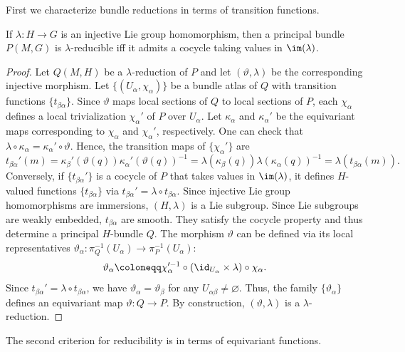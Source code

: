 First we characterize bundle reductions in terms of transition functions.

\begin{prop}[{{\cite[Prop.~1.6.1]{RS2}}}]\label{prop 1.6.1 RS2}
    If $\lambda:H\to G$ is an injective Lie group homomorphism, then a principal bundle $P(M,G)$ is $\lambda$-reducible iff it admits a cocycle taking values in $\im(\lambda)$.
\end{prop}
\begin{proof}
    Let $Q(M,H)$ be a $\lambda$-reduction of $P$ and let $(\vartheta,\lambda)$ be the corresponding injective morphism. Let $\{(U_\alpha,\chi_\alpha)\}$ be a bundle atlas of $Q$ with transition functions $\{t_{\beta\alpha}\}$. Since $\vartheta$ maps local sections of $Q$ to local sections of $P$, each $\chi_\alpha$ defines a local trivialization $\chi_\alpha'$ of $P$ over $U_\alpha$. Let $\kappa_\alpha$ and $\kappa_\alpha'$ be the equivariant maps corresponding to $\chi_\alpha$ and $\chi_\alpha'$, respectively. One can check that $\lambda\circ\kappa_\alpha=\kappa_\alpha'\circ\vartheta$. Hence, the transition maps of $\{\chi_\alpha'\}$ are
    \[t_{\beta\alpha}'(m)=\kappa_\beta'(\vartheta(q))\kappa_\alpha'(\vartheta(q))^{-1}=\lambda(\kappa_\beta(q))\lambda(\kappa_\alpha(q))^{-1}=\lambda(t_{\beta\alpha}(m)).\]
    Conversely, if $\{t_{\beta\alpha}'\}$ is a cocycle of $P$ that takes values in $\im(\lambda)$, it defines $H$-valued functions $\{t_{\beta\alpha}\}$ via $t_{\beta\alpha}'=\lambda\circ t_{\beta\alpha}$. Since injective Lie group homomorphisms are immersions, $(H,\lambda)$ is a Lie subgroup. Since Lie subgroups are weakly embedded, $t_{\beta\alpha}$ are smooth. They satisfy the cocycle property and thus determine a principal $H$-bundle $Q$. The morphism $\vartheta$ can be defined via its local representatives $\vartheta_\alpha:\pi_Q^{-1}(U_\alpha)\to \pi_P^{-1}(U_\alpha)$:
    \[\vartheta_\alpha\coloneqq \chi_\alpha^{\prime-1}\circ(\id_{U_\alpha}\times \lambda)\circ \chi_\alpha.\]
    Since $t_{\beta\alpha}'=\lambda\circ t_{\beta\alpha}$, we have $\vartheta_\alpha=\vartheta_\beta$ for any $U_{\alpha\beta}\neq\varnothing$. Thus, the family $\{\vartheta_\alpha\}$ defines an equivariant map $\vartheta:Q\to P$. By construction, $(\vartheta,\lambda)$ is a $\lambda$-reduction.
\end{proof}

The second criterion for reducibility is in terms of equivariant functions.

